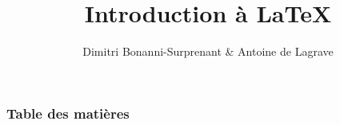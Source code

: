 \documentclass{beamer}
\title[Introduction à \LaTeX]
{Introduction à \LaTeX}
\author{Dimitri Bonanni-Surprenant \& Antoine de Lagrave}
\institute[]{
    Introduction à \LaTeX{} \\
    Département de Physique \\
    \today
}
\date[\today]
\begin{document}

    \frame{\titlepage}

    

    \begin{frame}
        \frametitle{Table des matières}
        \tableofcontents
    \end{frame}

    

    

    

    
\end{document}

